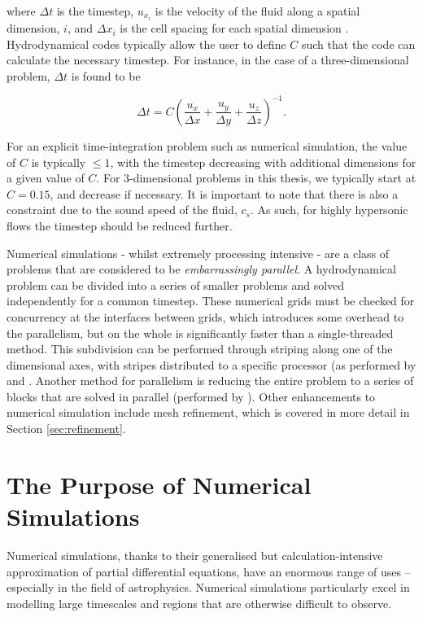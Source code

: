\noindent
where $\Delta t$ is the timestep, $u_{x_i}$ is the velocity of the fluid along a spatial dimension, $i$, and $\Delta x_i$ is the cell spacing for each spatial dimension \parencite[Ch.~5]{toro_riemann_2013}.
Hydrodynamical codes typically allow the user to define $C$ such that the code can calculate the necessary timestep.
For instance, in the case of a three-dimensional problem, $\Delta t$ is found to be

\begin{equation}
  \Delta t = C \left( \frac{u_x}{\Delta x} + \frac{u_y}{\Delta y} + \frac{u_z}{\Delta z} \right)^{-1} .
\end{equation}

\noindent
For an explicit time-integration problem such as numerical simulation, the value of $C$ is typically $\leq 1$, with the timestep decreasing with additional dimensions for a given value of $C$.
For 3-dimensional problems in this thesis, we typically start at $C = 0.15$, and decrease if necessary.
It is important to note that there is also a constraint due to the sound speed of the fluid, $c_s$.
As such, for highly hypersonic flows the timestep should be reduced further.

Numerical simulations - whilst extremely processing intensive - are a class of problems that are considered to be \emph{embarrassingly parallel}.
A hydrodynamical problem can be divided into a series of smaller problems and solved independently for a common timestep.
These numerical grids must be checked for concurrency at the interfaces between grids, which introduces some overhead to the parallelism, but on the whole is significantly faster than a single-threaded method.
This subdivision can be performed through striping along one of the dimensional axes, with stripes distributed to a specific processor (as performed by \mg{} and .
Another method for parallelism is reducing the entire problem to a series of blocks that are solved in parallel (performed by \athena). 
Other enhancements to numerical simulation include mesh refinement, which is covered in more detail in Section \ref{sec:refinement}.

\section{The Purpose of Numerical Simulations}
\label{sec:numerical-purpose}

Numerical simulations, thanks to their generalised but calculation-intensive approximation of partial differential equations, have an enormous range of uses -- especially in the field of astrophysics.
Numerical simulations particularly excel in modelling large timescales and regions that are otherwise difficult to observe.

